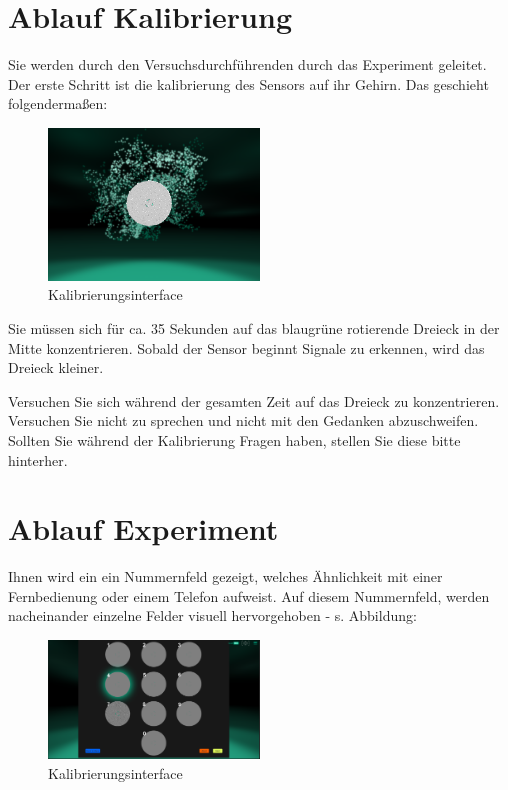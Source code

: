 \documentclass[a4paper,10pt,oneside,headsepline]{scrartcl}
\begin{document}
\section*{Ablauf Kalibrierung}

Sie werden durch den Versuchsdurchführenden durch das Experiment geleitet. Der erste Schritt ist die kalibrierung des Sensors auf ihr Gehirn. Das geschieht folgendermaßen:

\begin{figure}[h]     %
    \centering
    \includegraphics[width=0.5\textwidth]{CalibrationProcess.PNG} 
    \caption{Kalibrierungsinterface}
\end{figure}

Sie müssen sich für ca. 35 Sekunden auf das blaugrüne rotierende Dreieck in der Mitte konzentrieren. Sobald der Sensor beginnt Signale zu erkennen, wird das Dreieck kleiner. 

\medskip

Versuchen Sie sich während der gesamten Zeit auf das Dreieck zu konzentrieren. Versuchen Sie nicht zu sprechen und nicht mit den Gedanken abzuschweifen. Sollten Sie während der Kalibrierung Fragen haben, stellen Sie diese bitte hinterher.

\section*{Ablauf Experiment}

Ihnen wird ein ein Nummernfeld gezeigt, welches Ähnlichkeit mit einer Fernbedienung oder einem Telefon aufweist. Auf diesem Nummernfeld, werden nacheinander einzelne Felder visuell hervorgehoben - s. Abbildung:

\begin{figure}[h]     %
    \centering
    \includegraphics[width=0.5\textwidth]{Experiment.PNG} 
    \caption{Kalibrierungsinterface}
\end{figure}
\end{document}
